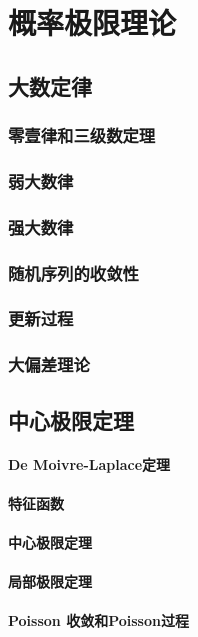 \part{概率极限理论}

	
\chapter{大数定律}
	\section{零壹律和三级数定理}
	\section{弱大数律}
	\section{强大数律}
	\section{随机序列的收敛性}
	\section{更新过程}
	\section{大偏差理论}

\chapter{中心极限定理}
	\subsection{De Moivre-Laplace定理}
	\subsection{特征函数}
	\subsection{中心极限定理}
	\subsection{局部极限定理}
	\subsection{Poisson 收敛和Poisson过程}

